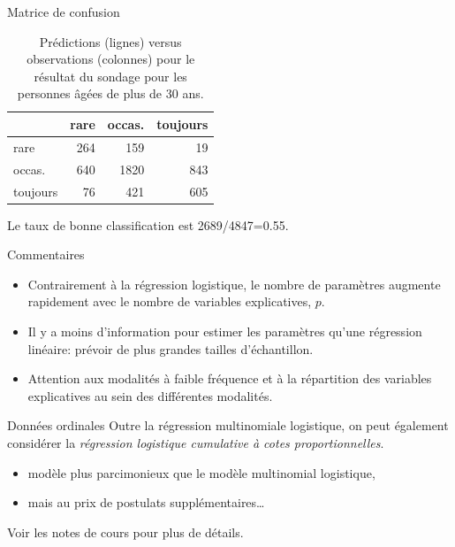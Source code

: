 \documentclass[
  ignorenonframetext,
]{beamer}
\providecommand{\tightlist}{%
  \setlength{\itemsep}{0pt}\setlength{\parskip}{0pt}}\usepackage{longtable,booktabs,array}
\begin{document}
\begin{frame}{Matrice de confusion}
\label{matrice-de-confusion}
\begin{longtable}[]{@{}lrrr@{}}

\caption{\label{tbl-confusmat}Prédictions (lignes) versus observations
(colonnes) pour le résultat du sondage pour les personnes âgées de plus
de 30 ans.}

\tabularnewline

\toprule\noalign{}
& rare & occas. & toujours \\
\midrule\noalign{}
\endhead
\bottomrule\noalign{}
\endlastfoot
rare & 264 & 159 & 19 \\
occas. & 640 & 1820 & 843 \\
toujours & 76 & 421 & 605 \\

\end{longtable}

Le taux de bonne classification est 2689/4847=0.55.
\end{frame}

\begin{frame}{Commentaires}
\label{commentaires}
\begin{itemize}
\tightlist
\item
  Contrairement à la régression logistique, le nombre de paramètres
  augmente rapidement avec le nombre de variables explicatives, \(p\).
\item
  Il y a moins d'information pour estimer les paramètres qu'une
  régression linéaire: prévoir de plus grandes tailles d'échantillon.
\item
  Attention aux modalités à faible fréquence et à la répartition des
  variables explicatives au sein des différentes modalités.
\end{itemize}
\end{frame}

\begin{frame}{Données ordinales}
\label{donnuxe9es-ordinales}
Outre la régression multinomiale logistique, on peut également
considérer la \emph{régression logistique cumulative à cotes
proportionnelles}.

\begin{itemize}
\tightlist
\item
  modèle plus parcimonieux que le modèle multinomial logistique,
\item
  mais au prix de postulats supplémentaires\ldots{}
\end{itemize}

Voir les notes de cours pour plus de détails.
\end{frame}
\end{document}
